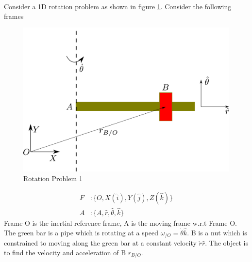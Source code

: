 Consider a 1D rotation problem as shown in figure \ref{Fig_Rotation_Problem_1}. Consider the following frames
\newpage
\begin{figure}[h!]
	\centering
	\includegraphics[width=0.65\linewidth]{Bilder/08_RotationProblem1.pdf}
	\caption{Rotation Problem 1}
	\label{Fig_Rotation_Problem_1}
\end{figure} 
\begin{align*}
	F &: \{O, X (\hat{i}), Y (\hat{j}), Z (\hat{k})\} \\
	A &: \{A, \hat{r}, \hat{\theta}, \hat{k}\}
\end{align*}
Frame O is the inertial reference frame, A is the moving frame w.r.t Frame O. The green bar is a pipe which is rotating at a speed $\omega_{/O} = \dot{\theta}\hat{k}$. B is a nut which is constrained to moving along the green bar at a constant velocity $\dot{r}\hat{r}$. The object is to find the velocity and acceleration of B $r_{B/O}$.

